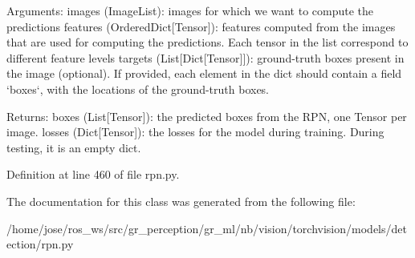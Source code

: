 \begin{DoxyVerb}Arguments:
    images (ImageList): images for which we want to compute the predictions
    features (OrderedDict[Tensor]): features computed from the images that are
used for computing the predictions. Each tensor in the list
correspond to different feature levels
    targets (List[Dict[Tensor]]): ground-truth boxes present in the image (optional).
If provided, each element in the dict should contain a field `boxes`,
with the locations of the ground-truth boxes.

Returns:
    boxes (List[Tensor]): the predicted boxes from the RPN, one Tensor per
image.
    losses (Dict[Tensor]): the losses for the model during training. During
testing, it is an empty dict.
\end{DoxyVerb}
 

Definition at line 460 of file rpn.\+py.



The documentation for this class was generated from the following file\+:\begin{DoxyCompactItemize}
\item 
/home/jose/ros\+\_\+ws/src/gr\+\_\+perception/gr\+\_\+ml/nb/vision/torchvision/models/detection/rpn.\+py\end{DoxyCompactItemize}
